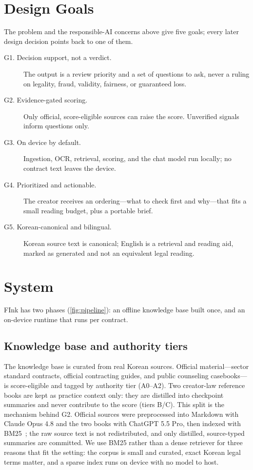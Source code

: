 \documentclass{article}
\theoremstyle{plain}
\begin{document}
\section{Design Goals}
\label{sec:goals}

The problem and the responsible-AI concerns above give five goals; every later
design decision points back to one of them.

\begin{description}
  \item[G1. Decision support, not a verdict.] The output is a review priority and
    a set of questions to ask, never a ruling on legality, fraud, validity,
    fairness, or guaranteed loss.
  \item[G2. Evidence-gated scoring.] Only official, score-eligible sources can
    raise the score. Unverified signals inform questions only.
  \item[G3. On device by default.] Ingestion, OCR, retrieval, scoring, and the
    chat model run locally; no contract text leaves the device.
  \item[G4. Prioritized and actionable.] The creator receives an ordering---what
    to check first and why---that fits a small reading budget, plus a portable
    brief.
  \item[G5. Korean-canonical and bilingual.] Korean source text is canonical;
    English is a retrieval and reading aid, marked as generated and not an
    equivalent legal reading.
\end{description}

\section{System}
\label{sec:system}

FInk has two phases (\cref{fig:pipeline}): an offline knowledge base built once,
and an on-device runtime that runs per contract.

\subsection{Knowledge base and authority tiers}
The knowledge base is curated from real Korean sources. Official material---sector
standard contracts, official contracting guides, and public counseling
casebooks---is score-eligible and tagged by authority tier (A0--A2). Two
creator-law reference books are kept as practice context only: they are distilled
into checkpoint summaries and never contribute to the score (tiers B/C). This
split is the mechanism behind G2. Official sources were preprocessed into Markdown
with Claude Opus 4.8 and the two books with ChatGPT 5.5 Pro, then indexed with
BM25~\citep{robertson2009bm25}; the raw source text is not redistributed, and only
distilled, source-typed summaries are committed. We use BM25 rather than a dense
retriever for three reasons that fit the setting: the corpus is small and curated,
exact Korean legal terms matter, and a sparse index runs on device with no model
to host.
\end{document}

